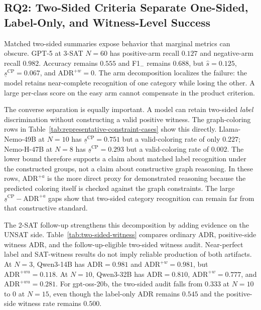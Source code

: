 \documentclass[acmsmall,screen,review,anonymous]{acmart}
\providecommand{\ADR}{\mathrm{ADR}}
\providecommand{\ADRw}{\mathrm{ADR}^{+w}}
\providecommand{\ADRa}{\mathrm{ADR}^{+a}}
\providecommand{\SepPoint}{\widehat{s}}
\providecommand{\SepCP}{\underline{s}^{\mathrm{CP}}}
\begin{document}
\subsection{RQ2: Two-Sided Criteria Separate One-Sided, Label-Only, and Witness-Level Success}
\label{sec:constraint-rq2}

Matched two-sided summaries expose behavior that marginal metrics can obscure.
GPT-5 at 3-SAT \(N=60\) has positive-arm recall \(0.127\) and negative-arm
recall \(0.982\). Accuracy remains \(0.555\) and F1\(_-\) remains
\(0.688\), but \(\SepPoint=0.125\), \(\SepCP=0.067\), and
\(\ADRw=0\). The arm decomposition localizes the failure: the model retains
near-complete recognition of one category while losing the other. A large
per-class score on the easy arm cannot compensate in the product criterion.

The converse separation is equally important. A model can retain two-sided
\emph{label} discrimination without constructing a valid positive witness.
The graph-coloring rows in Table~\ref{tab:representative-constraint-cases}
show this directly. Llama-Nemo-49B at \(N=10\) has \(\SepCP=0.751\) but a
valid-coloring rate of only \(0.227\); Nemo-H-47B at \(N=8\) has
\(\SepCP=0.293\) but a valid-coloring rate of \(0.002\). The lower bound
therefore supports a claim about matched label recognition under the
constructed groups, not a claim about constructive graph reasoning. In these
rows, \(\ADRa\) is the more direct proxy for demonstrated reasoning because
the predicted coloring itself is checked against the graph constraints. The
large \(\SepCP-\ADRa\) gaps show that two-sided category recognition can remain
far from that constructive standard.

The 2-SAT follow-up strengthens this decomposition by adding evidence on the
UNSAT side. Table~\ref{tab:two-sided-witness} compares ordinary ADR,
positive-side witness ADR, and the follow-up-eligible two-sided witness audit.
Near-perfect label and SAT-witness results do not imply reliable production of
both artifacts. At \(N=3\), Qwen3-14B has \(\ADR=0.981\) and
\(\ADRw=0.981\), but \(\mathrm{ADR}^{+wu}=0.118\). At \(N=10\),
Qwen3-32B has \(\ADR=0.810\), \(\ADRw=0.777\), and
\(\mathrm{ADR}^{+wu}=0.281\). For gpt-oss-20b, the two-sided audit falls
from \(0.333\) at \(N=10\) to \(0\) at \(N=15\), even though the label-only
ADR remains \(0.545\) and the positive-side witness rate remains \(0.500\).
\end{document}
